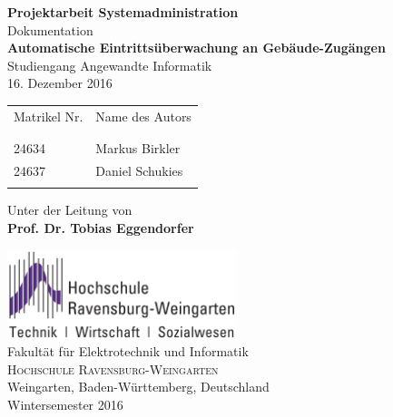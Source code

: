 \begin{titlepage}

\begin{center}

\textup{\small {\bf Projektarbeit Systemadministration} \\ Dokumentation}\\[0.2in]

\Large \textbf {Automatische Eintritts\"uberwachung an Geb\"aude-Zug\"angen}\\[0.5in]

        \small{Studiengang Angewandte Informatik}\\
        \vspace{.2in}
       \normalsize{16. Dezember 2016}
       \vspace{.4in}

\begin{table}[h]
\centering
\begin{tabular}{ll} \\
Matrikel Nr. & Name des Autors \\ \\ \hline
\\
24634 & Markus Birkler \\
24637 & Daniel Schukies \\ \\ \hline
\end{tabular}
\end{table}

\vspace{.1in}
Unter der Leitung von\\
{\textbf{Prof. Dr. Tobias Eggendorfer}}\\[0.2in]

\vfill

\includegraphics[width=0.5\textwidth]{hs}\\[0.2in]
\Large{Fakult\"at f\"ur Elektrotechnik und Informatik}\\
\normalsize
\textsc{Hochschule Ravensburg-Weingarten}\\
Weingarten, Baden-W\"urttemberg, Deutschland \\
\vspace{0.2cm}
Wintersemester 2016

\end{center}

\end{titlepage}
